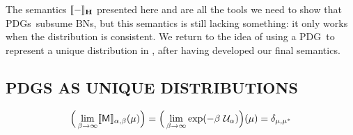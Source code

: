 \documentclass{article}
\newcommand\MaxEnt{_{\mathbf H}}
\newcommand{\sfM}{\mathsf M}
\newcommand{\MN}{PDG}
\newcommand{\MNs}{\MN s}
\numberwithin{equation}{section}
\begin{document}
	The semantics $\bbr{-}\MaxEnt$ presented here and  are all the tools we need to show that \MNs\ subsume BNs, but this semantics is still lacking something: it only works when the distribution is consistent.
	We return to the idea of using a \MN\ to represent a unique distribution in , after having developed our final semantics. 



                \subsection{PDGS AS UNIQUE DISTRIBUTIONS}\label{sec:uniq-dist-semantics-2} 

	\[ \Big(\lim_{\beta \to \infty} \bbr{\sfM}_{\alpha,\beta}(\mu)
        \Big)  = \Big(\lim_{\beta \to \infty} \exp(-\beta\ \mathcal
        U_\alpha) \Big)(\mu) = \delta_{\mu, \mu^*} \] 
	
\end{document}
